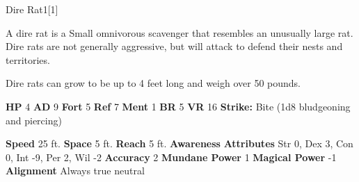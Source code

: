   
  \begin{monsection}{Dire Rat}{1}[1]
    \vspace{-1em}\vspace{-1em}
    \vspace{0em}

    
        A dire rat is a Small omnivorous scavenger that resembles an unusually large rat.
        Dire rats are not generally aggressive, but will attack to defend their nests and territories.
      
        Dire rats can grow to be up to 4 feet long and weigh over 50 pounds.
      

    \begin{spellcontent}
      \begin{spelltargetinginfo}
        \pari \textbf{HP} 4 \monsep
          \textbf{AD} 9 \monsep
          \textbf{Fort} 5 \monsep
          \textbf{Ref} 7 \monsep
          \textbf{Ment} 1
        \pari \textbf{BR} 5 \monsep
        \textbf{VR} 16
        \pari \textbf{Strike:}
            Bite  (1d8 bludgeoning and piercing)
      \end{spelltargetinginfo}
    \end{spellcontent}
    \begin{monsterfooter}
      \pari \textbf{Speed} 25 ft. \monsep
        \textbf{Space} 5 ft. \monsep
        \textbf{Reach} 5 ft.
      \pari \textbf{Awareness} 
      \pari \textbf{Attributes}
        Str 0, Dex 3,
        Con 0, Int -9,
        Per 2, Wil -2
      \pari \textbf{Accuracy} 2 \monsep
        \textbf{Mundane Power} 1 \monsep
      \textbf{Magical Power} -1
      \pari \textbf{Alignment} Always true neutral
    \end{monsterfooter}
  \end{monsection}
  
